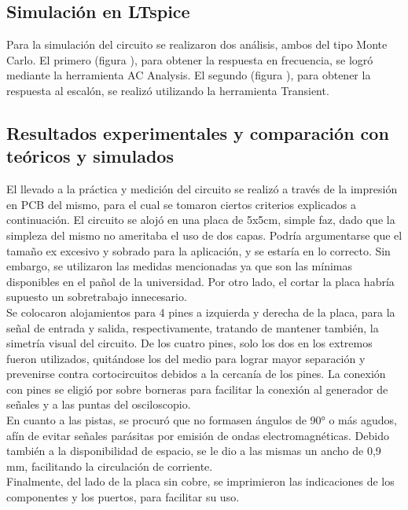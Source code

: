 \subsection{Simulaci\'on en LTspice}
Para la simulaci\'on del circuito se realizaron dos an\'alisis, ambos del tipo Monte Carlo.
El primero (figura ), para obtener la respuesta en frecuencia, se logr\'o mediante la herramienta AC Analysis.
El segundo (figura ), para obtener la respuesta al escal\'on, se realiz\'o utilizando la herramienta Transient.




\subsection{Resultados experimentales y comparaci\'on con te\'oricos y simulados}
El llevado a la pr\'actica y medici\'on del circuito se realiz\'o a trav\'es de la impresión en PCB del mismo, para el cual se tomaron ciertos criterios explicados a continuación.
El circuito se alojó en una placa de 5x5cm, simple faz, dado que la simpleza del mismo no ameritaba el uso de dos capas.
Podría argumentarse que el tamaño ex excesivo y sobrado para la aplicación, y se estaría en lo correcto.
Sin embargo, se utilizaron las medidas mencionadas ya que son las mínimas disponibles en el pañol de la universidad.
Por otro lado, el cortar la placa habría supuesto un sobretrabajo innecesario. \\
Se colocaron alojamientos para 4 pines a izquierda y derecha de la placa, para la señal de entrada y salida, respectivamente, tratando de mantener también, la simetría visual del circuito.
De los cuatro pines, solo los dos en los extremos fueron utilizados, quitándose los del medio para lograr mayor separación y prevenirse contra cortocircuitos debidos a la cercanía de los pines.
La conexión con pines se eligió por sobre borneras para facilitar la conexión al generador de señales y a las puntas del osciloscopio.\\
En cuanto a las pistas, se procuró que no formasen ángulos de 90° o más agudos, afín de evitar señales parásitas por emisión de ondas electromagnéticas.
Debido también a la disponibilidad de espacio, se le dio a las mismas un ancho de 0,9 mm, facilitando la circulación de corriente.\\
Finalmente, del lado de la placa sin cobre, se imprimieron las indicaciones de los componentes y los puertos, para facilitar su uso.
